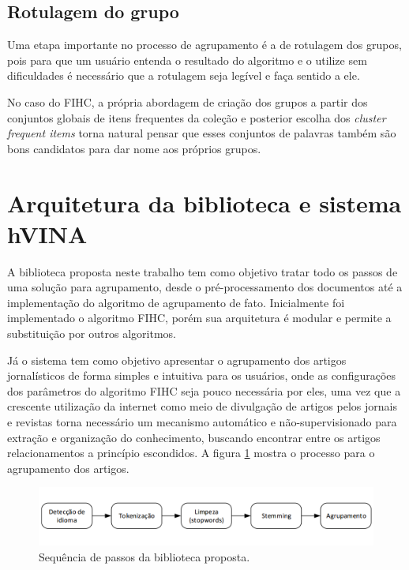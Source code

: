 \documentclass[a4paper,12pt]{article}
\begin{document}
\subsection {Rotulagem do grupo}
\label {sec:rotulagem_grupo}

Uma etapa importante no processo de agrupamento é a de rotulagem dos grupos, pois para que um usuário entenda o resultado do algoritmo e o utilize sem dificuldades é necessário que a rotulagem seja legível e faça sentido a ele. 

No caso do FIHC, a própria abordagem de criação dos grupos a partir dos conjuntos globais de itens frequentes da coleção e posterior escolha dos \textit{cluster frequent items} torna natural pensar que esses conjuntos de palavras também são bons candidatos para dar nome aos próprios grupos. 


\newpage

\section {Arquitetura da biblioteca e sistema hVINA}
\label {sec:arquitetura_biblioteca}

A biblioteca proposta neste trabalho tem como objetivo tratar todo os passos de uma solução para agrupamento, desde o pré-processamento dos documentos até a implementação do algoritmo de agrupamento de fato. Inicialmente foi implementado o algoritmo FIHC, porém sua arquitetura é modular e permite a substituição por outros algoritmos.

Já o sistema tem como objetivo apresentar o agrupamento dos artigos jornalísticos de forma simples e intuitiva para os usuários, onde as configurações dos parâmetros do algoritmo FIHC seja pouco necessária por eles, uma vez que a crescente utilização da internet como meio de divulgação de artigos pelos jornais e revistas torna necessário um mecanismo automático e não-supervisionado para extração e organização do conhecimento, buscando encontrar entre os artigos relacionamentos a princípio escondidos. A figura \ref{fig:arquitetura_biblioteca} mostra o processo para o agrupamento dos artigos.

\begin{figure}[h]
    \begin{center}
        \includegraphics[scale=0.35]{arquitetura.png}
    \end{center}
    \caption{Sequência de passos da biblioteca proposta.}
    \label{fig:arquitetura_biblioteca}
\end{figure}
\end{document}
